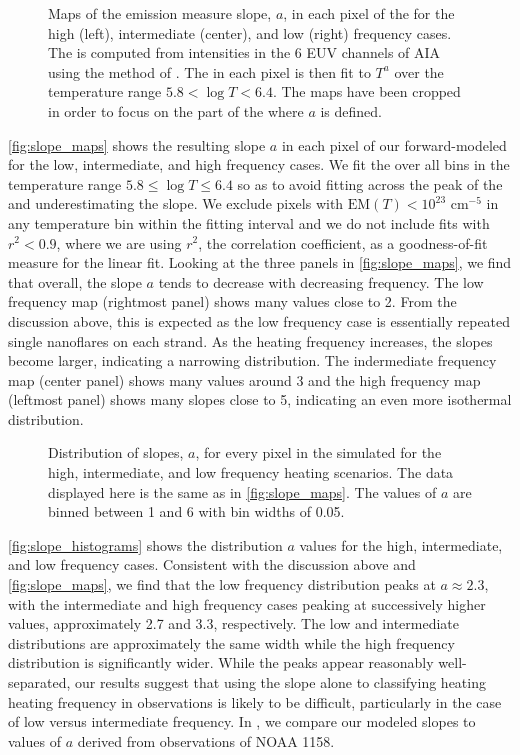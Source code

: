 \begin{figure*}
    \caption{Maps of the emission measure slope, $a$, in each pixel of the \AR{} for the high (left), intermediate (center), and low (right) frequency cases. The \dem{} is computed from intensities in the 6 EUV channels of AIA using the method of \citet{hannah_differential_2012}. The \dem{} in each pixel is then fit to $T^a$ over the temperature range $5.8<\log{T}<6.4$. The maps have been cropped in order to focus on the part of the \AR{} where $a$ is defined.}
    \label{fig:slope_maps}
\end{figure*}

\autoref{fig:slope_maps} shows the resulting \dem{} slope $a$ in each pixel of our forward-modeled \AR{} for the low, intermediate, and high frequency cases. We fit the \dem{} over all bins in the temperature range $5.8\le\log T\le6.4$ so as to avoid fitting across the peak of the \dem{} and underestimating the slope. We exclude pixels with $\mathrm{EM}(T)<10^{23}$ cm$^{-5}$ in any temperature bin within the fitting interval and we do not include fits with $r^2<0.9$, where we are using $r^2$, the correlation coefficient, as a goodness-of-fit measure for the linear fit. Looking at the three panels in \autoref{fig:slope_maps}, we find that overall, the \dem{} slope $a$ tends to decrease with decreasing frequency. The low frequency map (rightmost panel) shows many values close to 2. From the discussion above, this is expected as the low frequency case is essentially repeated single nanoflares on each strand. As the heating frequency increases, the slopes become larger, indicating a narrowing \dem{} distribution. The indermediate frequency map (center panel) shows many values around 3 and the high frequency map (leftmost panel) shows many slopes close to 5, indicating an even more isothermal distribution. 

\begin{figure}
    \caption{Distribution of \dem{} slopes, $a$, for every pixel in the simulated \AR{} for the high, intermediate, and low frequency heating scenarios. The data displayed here is the same as in \autoref{fig:slope_maps}. The values of $a$ are binned between 1 and 6 with bin widths of 0.05.}
    \label{fig:slope_histograms}
\end{figure}

\autoref{fig:slope_histograms} shows the distribution $a$ values for the high, intermediate, and low frequency cases. Consistent with the discussion above and \autoref{fig:slope_maps}, we find that the low frequency distribution peaks at $a\approx2.3$, with the intermediate and high frequency cases peaking at successively higher values, approximately 2.7 and 3.3, respectively. The low and intermediate distributions are approximately the same width while the high frequency distribution is significantly wider. While the peaks appear reasonably well-separated, our results suggest that using the \dem{} slope alone to classifying heating heating frequency in observations is likely to be difficult, particularly in the case of low versus intermediate frequency. In , we compare our modeled \dem{} slopes to values of $a$ derived from observations of NOAA 1158.
